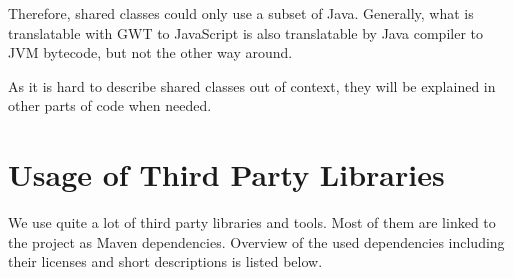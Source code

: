 Therefore, shared classes could only use a subset of Java. Generally, what is translatable with GWT to JavaScript is also translatable by Java compiler to JVM bytecode, but not the other way around.

As it is hard to describe shared classes out of context, they will be explained in other parts of code when needed.

\section{Usage of Third Party Libraries}

We use quite a lot of third party libraries and tools. Most of them are linked to the project as Maven dependencies. Overview of the used dependencies including their licenses and short descriptions is listed below.

